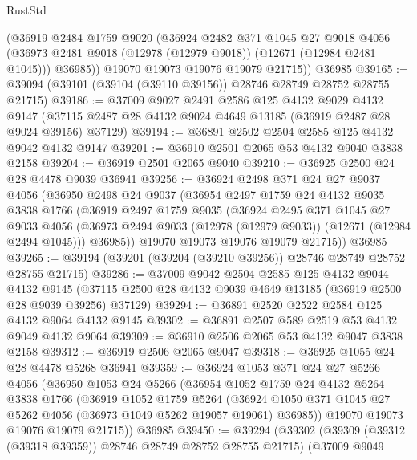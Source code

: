 \begin{lexlean}{RustStd}
\begin{coremodule}
        (@36919
          @2484
          @1759
          @9020
          (@36924
            @2482
            @371
            @1045
            @27
            @9018
            @4056
            (@36973 @2481 @9018 (@12978 (@12979 @9018)) (@12671 (@12984 @2481 @1045)))
            @36985))
        @19070
        @19073
        @19076
        @19079
        @21715))
    @36985
@39165 := @39094 (@39101 (@39104 (@39110 @39156)) @28746 @28749 @28752 @28755 @21715)
@39186 := @37009
    @9027
    @2491
    @2586
    @125
    @4132
    @9029
    @4132
    @9147
    (@37115 @2487 @28 @4132 @9024 @4649 @13185 (@36919 @2487 @28 @9024 @39156) @37129)
@39194 := @36891 @2502 @2504 @2585 @125 @4132 @9042 @4132 @9147
@39201 := @36910 @2501 @2065 @53 @4132 @9040 @3838 @2158
@39204 := @36919 @2501 @2065 @9040
@39210 := @36925 @2500 @24 @28 @4478 @9039 @36941
@39256 := @36924
    @2498
    @371
    @24
    @27
    @9037
    @4056
    (@36950
      @2498
      @24
      @9037
      (@36954
        @2497
        @1759
        @24
        @4132
        @9035
        @3838
        @1766
        (@36919
          @2497
          @1759
          @9035
          (@36924
            @2495
            @371
            @1045
            @27
            @9033
            @4056
            (@36973 @2494 @9033 (@12978 (@12979 @9033)) (@12671 (@12984 @2494 @1045)))
            @36985))
        @19070
        @19073
        @19076
        @19079
        @21715))
    @36985
@39265 := @39194 (@39201 (@39204 (@39210 @39256)) @28746 @28749 @28752 @28755 @21715)
@39286 := @37009
    @9042
    @2504
    @2585
    @125
    @4132
    @9044
    @4132
    @9145
    (@37115 @2500 @28 @4132 @9039 @4649 @13185 (@36919 @2500 @28 @9039 @39256) @37129)
@39294 := @36891 @2520 @2522 @2584 @125 @4132 @9064 @4132 @9145
@39302 := @36891 @2507 @589 @2519 @53 @4132 @9049 @4132 @9064
@39309 := @36910 @2506 @2065 @53 @4132 @9047 @3838 @2158
@39312 := @36919 @2506 @2065 @9047
@39318 := @36925 @1055 @24 @28 @4478 @5268 @36941
@39359 := @36924
    @1053
    @371
    @24
    @27
    @5266
    @4056
    (@36950
      @1053
      @24
      @5266
      (@36954
        @1052
        @1759
        @24
        @4132
        @5264
        @3838
        @1766
        (@36919
          @1052
          @1759
          @5264
          (@36924 @1050 @371 @1045 @27 @5262 @4056 (@36973 @1049 @5262 @19057 @19061) @36985))
        @19070
        @19073
        @19076
        @19079
        @21715))
    @36985
@39450 := @39294
    (@39302
      (@39309 (@39312 (@39318 @39359)) @28746 @28749 @28752 @28755 @21715)
      (@37009
        @9049

\end{coremodule}
\end{lexlean}
